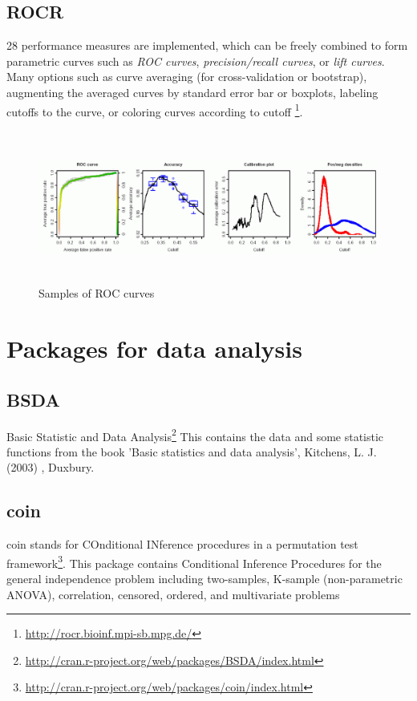 \subsection{ROCR}
\label{sec:rocr}


28 performance measures are implemented, which can be freely combined
to form parametric curves such as {\it ROC curves},
{\it precision/recall curves}, or {\it lift curves}. Many options such
as curve averaging (for cross-validation or bootstrap), augmenting the
averaged curves by standard error bar or boxplots, labeling cutoffs to
the curve, or coloring curves according to cutoff \footnote{\url{http://rocr.bioinf.mpi-sb.mpg.de/}}.

\begin{figure}[htb]
  \centerline{\includegraphics[height=5cm]{./images/ROCR_samples.eps}}
  \caption{Samples of ROC curves}\label{fig:ROCR_1}
\end{figure}

\section{Packages for data analysis}
\label{sec:pack-data-analys}

\subsection{BSDA}
\label{sec:bsda}
Basic Statistic and Data Analysis\footnote{\url{
http://cran.r-project.org/web/packages/BSDA/index.html}}
This contains the data and some statistic functions from the book 'Basic
statistics and data analysis', Kitchens, L. J. (2003) , Duxbury.

\subsection{coin}
\label{sec:coin}

coin stands for COnditional INference procedures in a permutation test
framework\footnote{\url{http://cran.r-project.org/web/packages/coin/index.html}}.
This package contains Conditional Inference Procedures for the general
independence problem including two-samples, K-sample (non-parametric
ANOVA), correlation, censored, ordered, and multivariate problems


